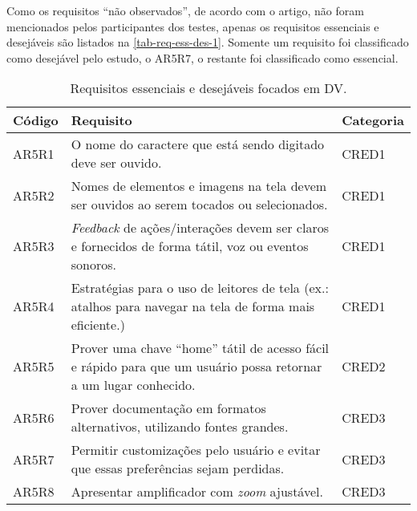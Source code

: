 Como os requisitos ``não observados'', de acordo com o artigo, não foram mencionados pelos participantes dos testes, apenas
os requisitos essenciais e desejáveis são listados na \autoref{tab-req-ess-des-1}.
Somente um requisito foi classificado como desejável pelo estudo, o AR5R7, o restante foi classificado como essencial.

\begin{table}[htb]
  \begin{center}
    \ABNTEXfontereduzida
    \caption{Requisitos essenciais e desejáveis focados em DV.}
    \label{tab-req-ess-des-1}
    \begin{tabular}{p{1.2cm}|p{12.1cm}|p{1.4cm}}
      \textbf{Código} & \textbf{Requisito}                                                                                                & \textbf{Categoria} \\
      \hline
      AR5R1           & O nome do caractere que está sendo digitado deve ser ouvido.                                                      & CRED1              \\
      \hline
      AR5R2           & Nomes de elementos e imagens na tela devem ser ouvidos ao serem tocados ou selecionados.                          & CRED1              \\
      \hline
      AR5R3           & \emph{Feedback} de ações/interações devem ser claros e fornecidos de forma tátil, voz ou eventos sonoros.         & CRED1              \\
      \hline
      AR5R4           & Estratégias para o uso de leitores de tela (ex.\@: atalhos para navegar na tela de forma mais eficiente.)         & CRED1              \\
      \hline
      AR5R5           & Prover uma chave ``home'' tátil de acesso fácil e rápido para que um usuário possa retornar a um lugar conhecido. & CRED2              \\
      \hline
      AR5R6           & Prover documentação em formatos alternativos, utilizando fontes grandes.                                          & CRED3              \\
      \hline
      AR5R7           & Permitir customizações pelo usuário e evitar que essas preferências sejam perdidas.                               & CRED3              \\
      \hline
      AR5R8           & Apresentar amplificador com \emph{zoom} ajustável.                                                                & CRED3              \\

\end{tabular}
\end{center}
\end{table}
